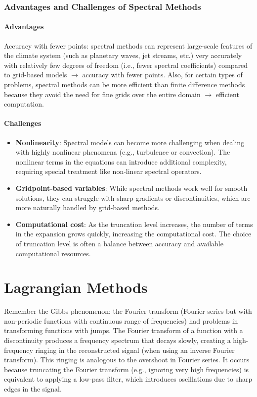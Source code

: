 \subsubsection{Advantages and Challenges of Spectral Methods}

\paragraph{Advantages}
 Accuracy with fewer points: spectral methods can represent large-scale features of the climate system (such as planetary waves, jet streams, etc.) very accurately with relatively few degrees of freedom (i.e., fewer spectral coefficients) compared to grid-based models $\rightarrow$ accuracy with fewer points. Also, for certain types of problems, spectral methods can be more efficient than finite difference methods because they avoid the need for fine grids over the entire domain $\rightarrow$ efficient computation. 
\paragraph{Challenges}
\begin{itemize}
    \item \textbf{Nonlinearity}: Spectral models can become more challenging when dealing with highly nonlinear phenomena (e.g., turbulence or convection). The nonlinear terms in the equations can introduce additional complexity, requiring special treatment like non-linear spectral operators.
    \item \textbf{Gridpoint-based variables}: While spectral methods work well for smooth solutions, they can struggle with sharp gradients or discontinuities, which are more naturally handled by grid-based methods.
    \item \textbf{Computational cost}: As the truncation level increases, the number of terms in the expansion grows quickly, increasing the computational cost. The choice of truncation level is often a balance between accuracy and available computational resources.
\end{itemize}



\section{Lagrangian Methods}
Remember the Gibbs phenomenon: the Fourier transform (Fourier series but with non-periodic functions with continuous range of frequencies) had problems in
transforming functions with jumps. 
The Fourier transform of a function with a discontinuity produces a frequency spectrum that decays slowly, creating a high-frequency ringing in the reconstructed signal (when using an inverse Fourier transform).
This ringing is analogous to the overshoot in Fourier series. It occurs because truncating the Fourier transform (e.g., ignoring very high frequencies) is equivalent to applying a low-pass filter, which introduces oscillations due to sharp edges in the signal. 


